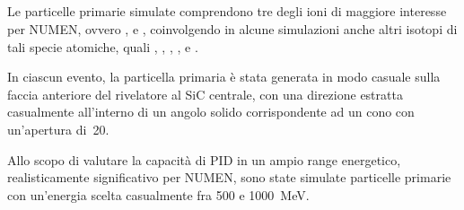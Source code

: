 \subsection{} \label{par:particelle_primarie}

Le particelle primarie simulate comprendono tre degli ioni di maggiore interesse per NUMEN, ovvero ,  e , coinvolgendo in alcune simulazioni anche altri isotopi di tali specie atomiche, quali , , , ,  e .


In ciascun evento, la particella primaria è stata generata in modo casuale sulla faccia anteriore del rivelatore al SiC centrale, con una direzione estratta casualmente all'interno di un angolo solido corrispondente ad un cono con un'apertura di~20\textdegree{}. 


Allo scopo di valutare la capacità di PID in un ampio range energetico, realisticamente significativo per NUMEN, sono state simulate particelle primarie con un'energia scelta casualmente fra 500 e 1000~MeV.

